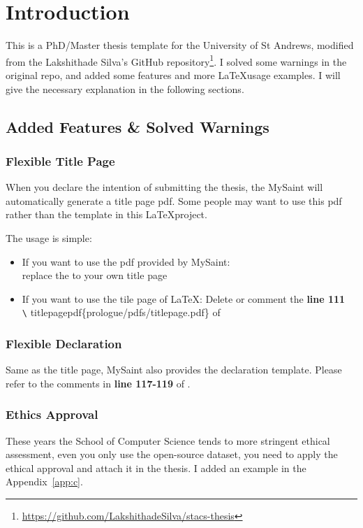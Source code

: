 \chapter{Introduction}
This is a PhD/Master thesis template for the University of St Andrews, modified from the Lakshithade Silva's GitHub repository\footnote{\url{https://github.com/LakshithadeSilva/stacs-thesis}}. I solved some warnings in the original repo, and added some features and more \LaTeX usage examples. I will give the necessary explanation in the following sections.

\section{Added Features \& Solved Warnings}
\subsection{Flexible Title Page}
When you declare the intention of submitting the thesis, the MySaint will automatically generate a title page pdf. Some people may want to use this pdf rather than the template in this \LaTeX project.

The usage is simple:
\begin{itemize}
    \item If you want to use the pdf provided by MySaint:\\
    replace the  to your own title page
    \item If you want to use the tile page of \LaTeX:
    Delete or comment the \textbf{line 111}\\
    \verb|\| titlepagepdf\{prologue/pdfs/titlepage.pdf\} of 
\end{itemize}

\subsection{Flexible Declaration}
Same as the title page, MySaint also provides the declaration template. Please refer to the comments in \textbf{line 117-119} of .

\subsection{Ethics Approval}
These years the School of Computer Science tends to more stringent ethical assessment, even you only use the open-source dataset, you need to apply the ethical approval and attach it in the thesis. I added an example in the Appendix~\ref{app:c}.

